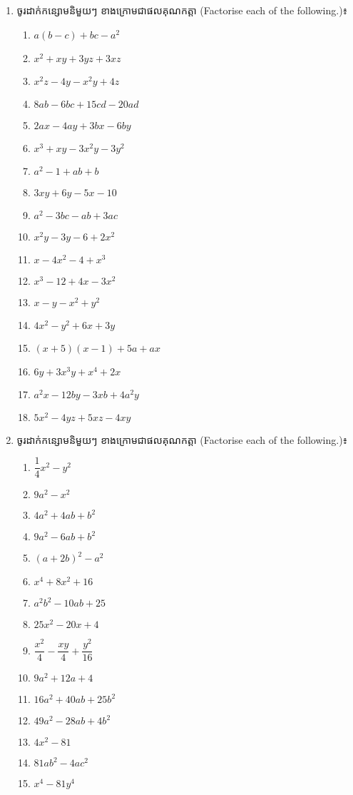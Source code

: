 \begin{enumerate}
\item  ចូរដាក់កន្សោមនិមួយៗ ខាងក្រោមជាផលគុណកត្តា (Factorise each of the following.)៖
\begin{multicols}{2}
\begin{enumerate}[label=\alph*.]
\item $a(b-c)+bc-a^2$
\item $x^2+xy+3yz+3xz$
\item $x^2z-4y-x^2y+4z$
\item $8ab-6bc+15cd-20ad$
\item $2ax-4ay+3bx-6by$
\item $x^3+xy-3x^2y-3y^2$
\item $a^2-1+ab+b$
\item $3xy+6y-5x-10$
\item $a^2-3bc-ab+3ac$
\item $x^2y-3y-6+2x^2$
\item $x-4x^2-4+x^3$
\item $x^3-12+4x-3x^2$
\item $x-y-x^2+y^2$
\item $4x^2-y^2+6x+3y$
\item $(x+5)(x-1)+5a+ax$
\item $6y+3x^3y+x^4+2x$
\item $a^2x-12by-3xb+4a^2y$
\item $5x^2-4yz+5xz-4xy$
\end{enumerate}
\end{multicols}


\item ចូរដាក់កន្សោមនិមួយៗ ខាងក្រោមជាផលគុណកត្តា (Factorise each of the following.)៖
\begin{multicols}{3}
\begin{enumerate}[label=\alph*.]
\item $\dfrac{1}{4}x^2-y^2$
\item $9a^2-x^2$
\item $4a^2+4ab+b^2$
\item $9a^2-6ab+b^2$
\item $(a+2b)^2-a^2$
\item $x^4+8x^2+16$
\item $a^2b^2-10ab+25$
\item $25x^2-20x+4$
\item $\dfrac{x^2}{4}-\dfrac{xy}{4}+\dfrac{y^2}{16}$
\item $9a^2+12a+4$
\item $16a^2+40ab+25b^2$
\item $49a^2-28ab+4b^2$
\item $4x^2-81$
\item $81ab^2-4ac^2$
\item $x^4-81y^4$
\end{enumerate}
\end{multicols}


\end{enumerate}
